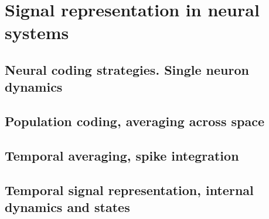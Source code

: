 \chapter{Signal representation in neural systems}
\label{ch:signal_represetations}


\section{Neural coding strategies. Single neuron dynamics}
\section{Population coding, averaging across space}
\section{Temporal averaging, spike integration}
\section{Temporal signal representation, internal dynamics and states}
